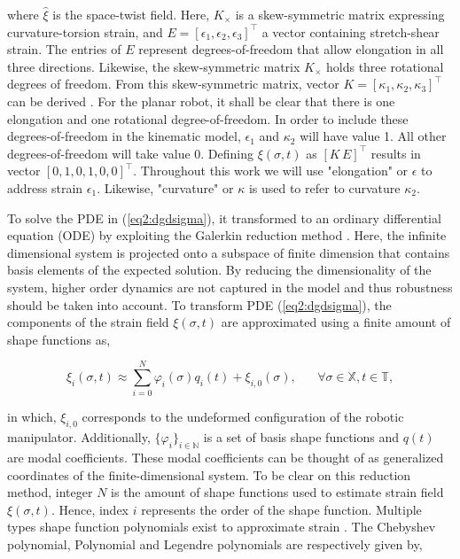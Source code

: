 where $\hat{\xi}$ is the space-twist field. Here, $K_\times$ is a skew-symmetric matrix expressing curvature-torsion strain, and $E = [\epsilon_1,\epsilon_2,\epsilon_3]^\top$ a vector containing stretch-shear strain. The entries of $E$ represent  degrees-of-freedom that allow elongation in all three directions. Likewise, the skew-symmetric matrix $K_{\times}$ holds three rotational degrees of freedom.  From this skew-symmetric matrix, vector $K = [\kappa_1,\kappa_2,\kappa_3]^\top$ can be derived \cite{Sola2018}. For the planar robot, it shall be clear that there is one elongation and one rotational degree-of-freedom. In order to include these degrees-of-freedom in the kinematic model, $\epsilon_1$ and $\kappa_2$ will have value 1. All other degrees-of-freedom will take value 0. Defining $\xi(\sigma,t)$ as $[K \hspace{2pt} E]^\top$ results in vector $[0,1,0,1,0,0]^\top$. Throughout this work we will use "elongation" or $\epsilon$ to address strain $\epsilon_1$. Likewise, "curvature" or $\kappa$ is used to refer to curvature $\kappa_2$.

To solve the PDE in (\ref{eq2:dgdsigma}), it transformed to an ordinary differential equation (ODE) by exploiting the Galerkin reduction method \cite{Galerkin}. Here, the infinite dimensional system is projected onto a subspace of finite dimension that contains basis elements of the expected solution. By reducing the dimensionality of the system, higher order dynamics are not captured in the model and thus robustness should be taken into account. To transform PDE (\ref{eq2:dgdsigma}), the components of the strain field $\xi(\sigma,t)$ are approximated using a finite amount of shape functions as,

\begin{equation}
    \xi_i(\sigma,t) \approx \sum_{i=0}^N \varphi_i(\sigma)q_i(t) + \xi_{i,0}(\sigma), \hspace{20pt} \forall \sigma \in \mathbb{X}, t \in \mathbb{T},
\end{equation}

in which, $\xi_{i,0}$ corresponds to the undeformed configuration of the robotic manipulator. Additionally, $\{\varphi_i\}_{i \in \mathbb{N}}$ is a set of basis shape functions and $q(t)$ are modal coefficients. These modal coefficients can be thought of as generalized coordinates of the finite-dimensional system. To be clear on this reduction method, integer $N$ is the amount of shape functions used to estimate strain field $\xi(\sigma,t)$. Hence, index $i$ represents the order of the shape function. Multiple types shape function polynomials exist to approximate strain \cite{Galerkin}. The Chebyshev polynomial, Polynomial and Legendre polynomials are respectively given by,

